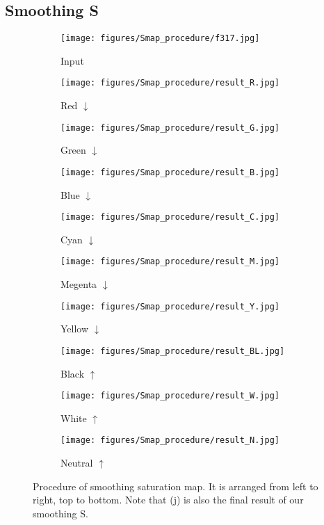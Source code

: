 \documentclass[runningheads]{llncs}
\begin{document}
\subsection{Smoothing S}

\begin{figure}[htbp]
\centering

\begin{subfigure}[t]{0.17\linewidth}
\centering
\texttt{[image: figures/Smap\_procedure/f317.jpg]}
\caption{Input}
\end{subfigure}
\begin{subfigure}[t]{0.17\linewidth}
\centering
\texttt{[image: figures/Smap\_procedure/result\_R.jpg]}
\caption{Red $\downarrow$}
\end{subfigure}
\begin{subfigure}[t]{0.17\linewidth}
\centering
\texttt{[image: figures/Smap\_procedure/result\_G.jpg]}
\caption{Green $\downarrow$}
\end{subfigure}
\begin{subfigure}[t]{0.17\linewidth}
\centering
\texttt{[image: figures/Smap\_procedure/result\_B.jpg]}
\caption{Blue $\downarrow$}
\end{subfigure}
\begin{subfigure}[t]{0.17\linewidth}
\centering
\texttt{[image: figures/Smap\_procedure/result\_C.jpg]}
\caption{Cyan $\downarrow$}
\end{subfigure}

\begin{subfigure}[t]{0.17\linewidth}
\centering
\texttt{[image: figures/Smap\_procedure/result\_M.jpg]}
\caption{Megenta $\downarrow$}
\end{subfigure}
\begin{subfigure}[t]{0.17\linewidth}
\centering
\texttt{[image: figures/Smap\_procedure/result\_Y.jpg]}
\caption{Yellow $\downarrow$}
\end{subfigure}
\begin{subfigure}[t]{0.17\linewidth}
\centering
\texttt{[image: figures/Smap\_procedure/result\_BL.jpg]}
\caption{Black $\uparrow$}
\end{subfigure}
\begin{subfigure}[t]{0.17\linewidth}
\centering
\texttt{[image: figures/Smap\_procedure/result\_W.jpg]}
\caption{White $\uparrow$}
\end{subfigure}
\begin{subfigure}[t]{0.17\linewidth}
\centering
\texttt{[image: figures/Smap\_procedure/result\_N.jpg]}
\caption{Neutral $\uparrow$}
\end{subfigure}
\caption{Procedure of smoothing saturation map. It is arranged from left to right, top to bottom. Note that (j) is also the final result of our smoothing S.}

\label{fig:smap}
\end{figure}
\end{document}
